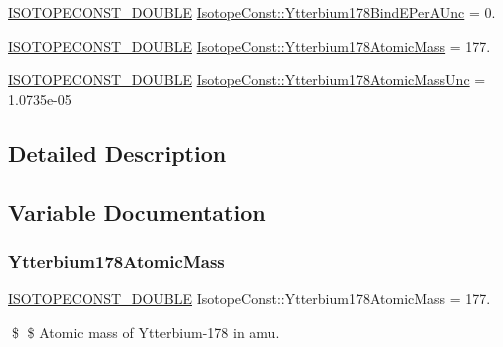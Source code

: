 \begin{DoxyCompactItemize}
\mbox{\hyperlink{group___isotope_const-_macros_ga8f45a7272ce02c0b4c65c44636ed719a}{I\+S\+O\+T\+O\+P\+E\+C\+O\+N\+S\+T\+\_\+\+D\+O\+U\+B\+LE}} \mbox{\hyperlink{group___isotope_const-_ytterbium-_yb178_ga78150dca59f2bbe4545d9c750734c573}{Isotope\+Const\+::\+Ytterbium178\+Bind\+E\+Per\+A\+Unc}} = 0.
\item 
\mbox{\hyperlink{group___isotope_const-_macros_ga8f45a7272ce02c0b4c65c44636ed719a}{I\+S\+O\+T\+O\+P\+E\+C\+O\+N\+S\+T\+\_\+\+D\+O\+U\+B\+LE}} \mbox{\hyperlink{group___isotope_const-_ytterbium-_yb178_gac05242c83ab5547234cb2d788c5cea07}{Isotope\+Const\+::\+Ytterbium178\+Atomic\+Mass}} = 177.
\item 
\mbox{\hyperlink{group___isotope_const-_macros_ga8f45a7272ce02c0b4c65c44636ed719a}{I\+S\+O\+T\+O\+P\+E\+C\+O\+N\+S\+T\+\_\+\+D\+O\+U\+B\+LE}} \mbox{\hyperlink{group___isotope_const-_ytterbium-_yb178_ga105f93a0056271b8c00fb215bca8d925}{Isotope\+Const\+::\+Ytterbium178\+Atomic\+Mass\+Unc}} = 1.\+0735e-\/05
\end{DoxyCompactItemize}


\subsection{Detailed Description}


\subsection{Variable Documentation}
\mbox{\label{group___isotope_const-_ytterbium-_yb178_gac05242c83ab5547234cb2d788c5cea07}} 
\subsubsection{\texorpdfstring{Ytterbium178\+Atomic\+Mass}{Ytterbium178AtomicMass}}
{\footnotesize\ttfamily \mbox{\hyperlink{group___isotope_const-_macros_ga8f45a7272ce02c0b4c65c44636ed719a}{I\+S\+O\+T\+O\+P\+E\+C\+O\+N\+S\+T\+\_\+\+D\+O\+U\+B\+LE}} Isotope\+Const\+::\+Ytterbium178\+Atomic\+Mass = 177.}

\$ \$ Atomic mass of Ytterbium-\/178 in amu. \mbox{\label{group___isotope_const-_ytterbium-_yb178_ga105f93a0056271b8c00fb215bca8d925}} 
